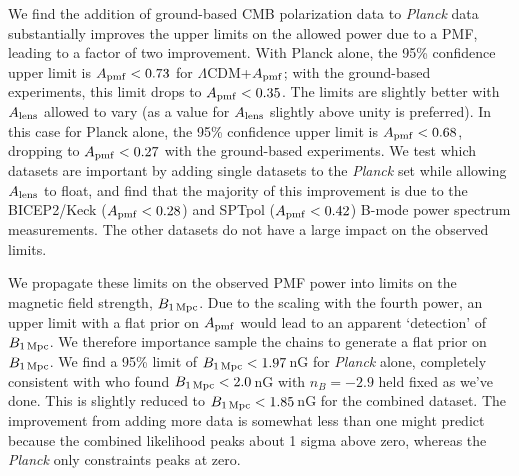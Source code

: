 \documentclass[preprint]{emulateapj}
\newcommand{\apmf}{\ensuremath{A_{\rm pmf}}}
\newcommand{\bpmf}{\ensuremath{B_{\rm 1\,Mpc}}}
\newcommand{\alens}{\ensuremath{A_{\rm lens}}}
\newcommand{\lcdm}{\ensuremath{\Lambda}CDM}
\newcommand{\planck}{{\sl Planck}}
\newcommand{\bicepkeck}{BICEP2/Keck}
\newcommand{\sptpol}{SPTpol}
\begin{document}
We find the addition of ground-based CMB polarization data to \planck{} data substantially improves the upper limits on the allowed power due to a PMF, leading to a factor of two improvement. 
With Planck alone, the 95\% confidence upper limit is $\apmf <  0.73$ for \lcdm{}+\apmf{}; with the ground-based experiments, this limit drops to $\apmf <  0.35$. 
The limits are slightly better with \alens{} allowed to vary (as a value for \alens{} slightly above unity is preferred). 
In this case for  Planck alone, the 95\% confidence upper limit is $\apmf <  0.68$, dropping to $\apmf <  0.27$ with the ground-based experiments. 
We test which datasets are important by adding single datasets to the \planck{} set while allowing \alens{} to float, and find that the majority of this improvement is due to the \bicepkeck{} ($\apmf <  0.28$) and \sptpol{} ($\apmf <  0.42$) B-mode power spectrum measurements. 
The other datasets do not have a large impact on the observed limits. 

We propagate these limits on the observed PMF power into limits on the magnetic field strength, \bpmf. 
Due to the scaling with the fourth power, an upper limit with a flat prior on \apmf{} would lead to an apparent `detection' of \bpmf. 
We therefore importance sample the chains to generate a flat prior on \bpmf. 
We find a 95\% limit of $\bpmf < 1.97$\,nG for \planck{} alone, completely consistent with \citep{planck15-19} who found $\bpmf < 2.0$\,nG with $n_B=-2.9$ held fixed as we've done. 
This is slightly reduced to $\bpmf < 1.85$\,nG for the combined dataset. 
The improvement from adding more data is somewhat less than one might predict because the combined likelihood peaks about 1 sigma above zero, whereas the \planck{} only constraints peaks at zero. 
\end{document}
